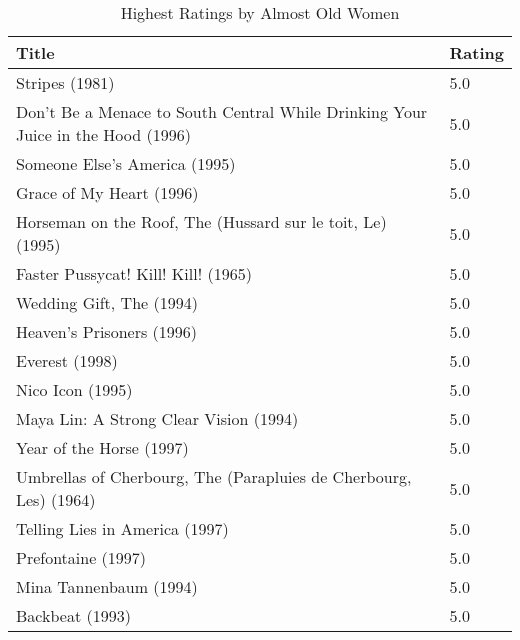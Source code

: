 \begin{table}[h!]
\centering
\begin{tabular}{| l | l |}
\hline
Title & Rating \\
\hline
Stripes (1981) & 5.0 \\
Don't Be a Menace to South Central While Drinking Your Juice in the Hood (1996) & 5.0 \\
Someone Else's America (1995) & 5.0 \\
Grace of My Heart (1996) & 5.0 \\
Horseman on the Roof, The (Hussard sur le toit, Le) (1995) & 5.0 \\
Faster Pussycat! Kill! Kill! (1965) & 5.0 \\
Wedding Gift, The (1994) & 5.0 \\
Heaven's Prisoners (1996) & 5.0 \\
Everest (1998) & 5.0 \\
Nico Icon (1995) & 5.0 \\
Maya Lin: A Strong Clear Vision (1994) & 5.0 \\
Year of the Horse (1997) & 5.0 \\
Umbrellas of Cherbourg, The (Parapluies de Cherbourg, Les) (1964) & 5.0 \\
Telling Lies in America (1997) & 5.0 \\
Prefontaine (1997) & 5.0 \\
Mina Tannenbaum (1994) & 5.0 \\
Backbeat (1993) & 5.0 \\
\hline
\end{tabular}
\caption{Highest Ratings by Almost Old Women}
\label{tab:hrbaow}
\end{table}

